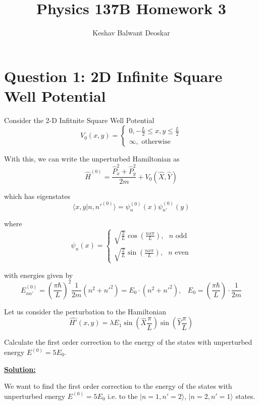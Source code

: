 \documentclass{article}
\title{Physics 137B Homework 3}
\author{Keshav Balwant Deoskar}
\newcommand{\ket}[1]{|#1 \rangle}
\newcommand{\inner}[2]{\langle #1 | #2 \rangle}
\begin{document}
\maketitle


\section*{Question 1: 2D Infinite Square Well Potential} 

Consider the 2-D Infitnite Square Well Potential 
\[ V_0(x, y)  = \begin{cases}
  0, -\frac{L}{2} \leq x, y \leq \frac{L}{2} \\
  \infty, \text{ otherwise}
\end{cases}\]

With this, we can write the unperturbed Hamiltonian as 
\[ \hat{H}^{(0)} = \frac{\hat{P}_x^2 + \hat{P}_y^2}{2m} + V_0(\hat{X}, \hat{Y}) \]

which has eigenstates 
\[ \inner{x, y}{n, n'^{(0)}} = \psi_n^{(0)}(x) \psi_{n'}^{(0)}(y) \]

where 
\[ \psi_n(x) = \begin{cases}
  \sqrt{\frac{2}{L}} \cos(\frac{n x \pi}{L}), \text{  $n$ odd} \\
  \sqrt{\frac{2}{L}} \sin(\frac{n x \pi}{L}), \text{  $n$ even} 
\end{cases} \]

with energies given by 
\[ E_{n n'}^{(0)} = \left( \frac{\pi \hbar}{L} \right)^2 \frac{1}{2m}(n^2 + n'^2) = E_0 \cdot (n^2 + n'^2), \;\;\;E_0 = \left(\frac{\pi \hbar}{L}\right) \cdot \frac{1}{2m} \]

Let us consider the perturbation to the Hamiltonian 
\[ \hat{H'}(x, y) = \lambda E_1 \sin \left(\hat{X} \frac{\pi}{L}\right) \sin \left( \hat{Y} \frac{\pi}{L} \right) \]

Calculate the first order correction to the energy of the states with unperturbed energy $E^{(0)} = 5E_0$.

\vskip 0.5cm
\underline{\textbf{Solution:}} 

\vskip 0.5cm
We want to find the first order correction to the energy of the states with unperturbed energy $E^{(0)} = 5E_0$ i.e. to the $\ket{n = 1, n' = 2}$, $\ket{n = 2, n' = 1}$ states.
\end{document}
